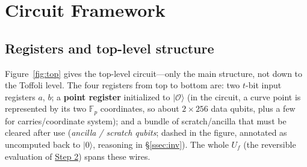\documentclass[11pt]{article}
\newcommand{\secref}[1]{\hyperref[#1]{\S\ref*{#1}}}
\begin{document}
\section{Circuit Framework}
\label{sec:circuit}

\subsection{Registers and top-level structure}

Figure~\ref{fig:top} gives the top-level circuit---only the main structure, not down to the Toffoli level. The four registers from top to bottom are: two $t$-bit input
registers $a$, $b$; a \textbf{point register} initialized to $\lvert\mathcal{O}\rangle$ (in the circuit, a curve point is represented by its two
$\mathbb{F}_p$ coordinates, so about $2\times256$ data qubits, plus a few for carries/coordinate system); and a bundle of scratch/ancilla that must be cleared after use (\emph{ancilla / scratch qubits}; dashed in the figure, annotated as uncomputed back to $\lvert0\rangle$, reasoning in \secref{ssec:inv}). The whole $U_f$ (the reversible
evaluation of \hyperref[step:eval]{Step 2}) spans these wires.
\end{document}
